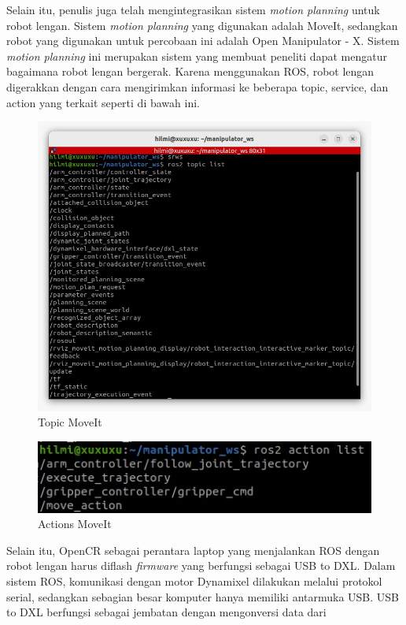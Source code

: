 Selain itu, penulis juga telah mengintegrasikan sistem \emph{motion planning} untuk robot lengan. Sistem \emph{motion planning} yang digunakan adalah MoveIt,
sedangkan robot yang digunakan untuk percobaan ini adalah Open Manipulator - X. Sistem \emph{motion planning} ini merupakan sistem yang membuat
peneliti dapat mengatur bagaimana robot lengan bergerak. Karena menggunakan ROS, robot lengan digerakkan dengan cara mengirimkan informasi
ke beberapa topic, service, dan action yang terkait seperti di bawah ini.
\begin{figure} [H] \centering
    \includegraphics[scale=0.3]{gambar/moveit topic.jpeg}
    \caption{Topic MoveIt}
    \label{fig:moveit_topic}
  \end{figure}
\begin{figure} [H] \centering
    \includegraphics[scale=0.4]{gambar/moveit actions.jpeg}
    \caption{Actions MoveIt}
    \label{fig:moveit_actions}
\end{figure}
Selain itu, OpenCR sebagai perantara laptop yang menjalankan ROS dengan robot lengan harus diflash \emph{firmware} yang berfungsi sebagai
USB to DXL. Dalam sistem ROS, komunikasi dengan motor Dynamixel dilakukan melalui protokol serial,
sedangkan sebagian besar komputer hanya memiliki antarmuka USB. USB to DXL berfungsi sebagai jembatan dengan mengonversi data dari
